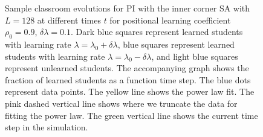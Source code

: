 \begin{figure}[htbp!]
   \caption[Example classroom evolution for heterogeneous PI set up with high positional learning factor $\rho_0$ and low heterogeneity $\delta\lambda$]{Sample classroom evolutions for PI with the inner corner SA with $L=128$ at different times $t$ for positional learning coefficient $\rho_0=0.9$, $\delta\lambda = 0.1$.
   Dark blue squares represent learned students with learning rate $\lambda = \lambda_0 + \delta\lambda$, blue squares represent learned students with learning rate $\lambda = \lambda_0 - \delta\lambda$, and light blue squares represent unlearned students.
   The accompanying graph shows the fraction of learned students as a function time step.
   The blue dots represent data points. 
   The yellow line shows the power law fit.
   The pink dashed vertical line shows where we truncate the data for fitting the power law.
   The green vertical line shows the current time step in the simulation.
   }
   \label{fig:2DBPCAIH sample class evolution high rho}
\end{figure}

